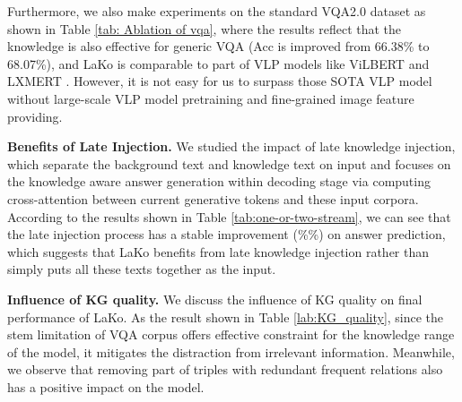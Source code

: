 \documentclass[sigconf]{acmart}
\newcommand{\cjy}[1]{{\color{black}#1}}
\begin{document}
Furthermore, we also make experiments on the standard \cjy{VQA}2.0 dataset as shown in Table \ref{tab: Ablation of vqa}, where the results reflect that the knowledge is also effective for generic VQA (\cjy{Acc is improved} from 66.38\% to 68.07\%), and LaKo is comparable to part of VLP models like ViLBERT \citep{DBLP:conf/nips/LuBPL19} and LXMERT \citep{DBLP:conf/emnlp/TanB19}. 
However, it is not easy for us to surpass those SOTA VLP model without large-scale VLP model pretraining and fine-grained image feature providing. 

\noindent\textbf{Beneﬁts of Late Injection.} 
We studied the impact of late knowledge injection, 
which separate the background text and knowledge text on input and focuses on the knowledge aware answer generation within decoding stage via  computing cross-attention between  current generative tokens and these input corpora. 
\cjy{According to} the results shown in Table \ref{tab:one-or-two-stream}, we can see that the late injection process has a stable improvement (\%\%) on answer prediction, which suggests that LaKo 
\cjy{benefits} from late knowledge injection rather than simply put\cjy{s} all these texts together as the input. 

\noindent\textbf{Influence of KG quality.}
We discuss the influence of KG quality on final performance of LaKo.
As the result shown in Table \ref{lab:KG_quality}, since the stem limitation of VQA corpus offers effective constraint for the knowledge range of the model, it mitigates the distraction from irrelevant information.
Meanwhile, we observe that removing part of triples with redundant frequent relations also has a positive impact on the model.
\begin{table}[htbp]
    \centering
    \caption{``Stem Filter'': filtering out triples whose heads or tails do not contain stems in VQA corpus.
    ``Freq. Rm'': selectively removing those triples which contain frequent relations (see Sec. \ref{sec:KGc} for details).}
    \vspace{-1mm}

    \label{lab:KG_quality}
    \vspace{-1mm}
\end{table}
\end{document}

